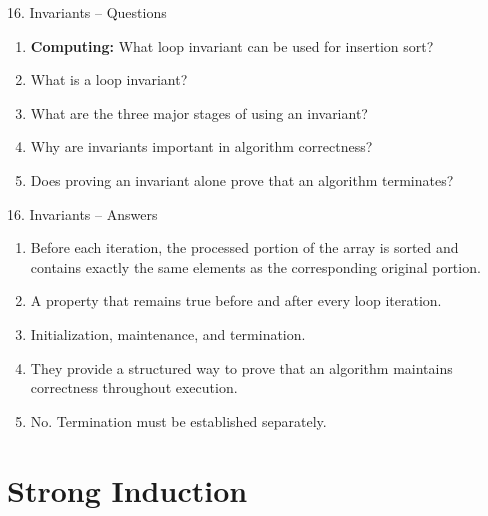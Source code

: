 \documentclass[aspectratio=169,11pt]{beamer}
\begin{document}
\begin{frame}{16. Invariants -- Questions}

\begin{enumerate}
\item \textbf{Computing:} What loop invariant can be used for insertion sort?

\item What is a loop invariant?

\item What are the three major stages of using an invariant?

\item Why are invariants important in algorithm correctness?

\item Does proving an invariant alone prove that an algorithm terminates?
\end{enumerate}

\end{frame}

\begin{frame}{16. Invariants -- Answers}

\begin{enumerate}
\item Before each iteration, the processed portion of the array is sorted and contains exactly the same elements as the corresponding original portion.

\item A property that remains true before and after every loop iteration.

\item Initialization, maintenance, and termination.

\item They provide a structured way to prove that an algorithm maintains correctness throughout execution.

\item No. Termination must be established separately.
\end{enumerate}

\end{frame}


\section{Strong Induction}
\end{document}
